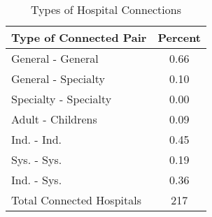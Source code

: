 \begin{table}[ht!]
\centering
\caption{Types of Hospital Connections\label{tab:hospital_pair_types}}
\centering
\begin{tabular}[t]{lc}
\toprule
Type of Connected Pair & Percent\\
\midrule
General - General & 0.66\\
General - Specialty & 0.10\\
Specialty - Specialty & 0.00\\
\addlinespace[0.3em]
Adult - Childrens & 0.09\\
\addlinespace[0.3em]
Ind. - Ind. & 0.45\\
Sys. - Sys. & 0.19\\
Ind. - Sys. & 0.36\\
\addlinespace[0.3em]
Total Connected Hospitals & 217\\
\bottomrule
\end{tabular}
\end{table}
